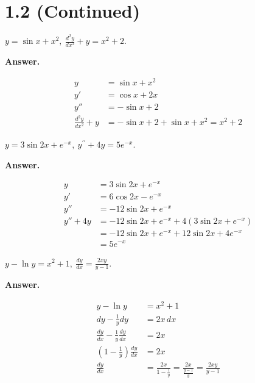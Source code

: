 \documentclass[12pt]{article}
\newenvironment{Answer}{%
  \par\medskip\noindent
  \begin{list}{}{%
    \setlength{\leftmargin}{0pt}%
    \setlength{\itemindent}{0pt}%
    \setlength{\listparindent}{0pt}%
  }%
  \item\relax
  \textbf{Answer.}\quad\ignorespaces
}{%
  \end{list}
  \par\medskip
}
\begin{document}
\section*{1.2 (Continued)}
\begin{enumerate}[label=\textbf{\arabic*.}, leftmargin=*]
  \item[3.] $\displaystyle y=\sin x+x^{2},\ \frac{d^{2}y}{dx^{2}}+y=x^{2}+2$.
  \begin{Answer}
  \begin{align*}
    y &= \sin x + x^2 \\[0.3em]
    y' &= \cos x + 2x \\[0.3em]
    y'' &= -\sin x + 2 \\[0.3em]
    \displaystyle \frac{d^2y}{dx^2} + y &= -\sin x + 2 + \sin x + x^2 = x^2 + 2
  \end{align*}
  \end{Answer}

  \item[8.] $\displaystyle y=3\sin 2x+e^{-x},\ y^{\prime\prime}+4y=5e^{-x}$.
  \begin{Answer}
  \begin{align*}
    y &= 3\sin 2x + e^{-x} \\[0.3em]
    y' &= 6\cos 2x - e^{-x} \\[0.3em]
    y'' &= -12\sin 2x + e^{-x} \\[0.3em]
    y'' + 4y &= -12\sin 2x + e^{-x} + 4(3\sin 2x + e^{-x}) \\[0.3em]
    &= -12\sin 2x + e^{-x} + 12\sin 2x + 4e^{-x} \\[0.3em]
    &= 5e^{-x}
  \end{align*}
  \end{Answer}

  \item[10.] $\displaystyle y-\ln y=x^{2}+1,\ \frac{dy}{dx}=\frac{2xy}{y-1}$.
  \begin{Answer}
  \begin{align*}
    y - \ln y &= x^2 + 1 \\[0.3em]
    \displaystyle dy - \frac{1}{y}dy &= 2x \, dx \\[0.3em]
    \displaystyle \frac{dy}{dx} - \frac{1}{y}\frac{dy}{dx} &= 2x \\[0.3em]
    \displaystyle \left(1 - \frac{1}{y}\right)\frac{dy}{dx} &= 2x \\[0.3em]
    \displaystyle \frac{dy}{dx} &= \displaystyle \frac{2x}{1 - \frac{1}{y}} = \frac{2x}{\frac{y-1}{y}} = \frac{2xy}{y-1}
  \end{align*}
  \end{Answer}


\end{enumerate}
\end{document}
